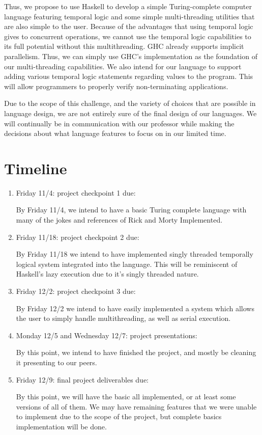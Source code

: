 \documentclass[numbers]{sigplanconf}
\begin{document}
 Thus, we propose to use Haskell to develop a simple Turing-complete
 computer language featuring temporal logic and some simple
 multi-threading utilities that are also simple to the user.
 Because of the advantages that using temporal logic gives to
 concurrent operations, we cannot use the temporal logic 
 capabilities to its full potential without this multithreading.
 GHC already supports implicit parallelism. Thus, we can 
 simply use GHC's implementation as the foundation
 of our multi-threading capabilities. We also intend for our 
 language to support adding various temporal logic
 statements regarding values to the program.
 This will allow programmers to properly verify non-terminating
 applications. 

 Due to the scope of this challenge, and the variety of choices that
 are possible in language design, we are not entirely sure of the
 final design of our languages. We will continually be in communication
 with our professor while making the decisions about what language
 features to focus on in our limited time.
\section{Timeline}
\begin{enumerate}
\item    Friday 11/4: project checkpoint 1 due:

  By Friday 11/4, we intend to have a basic Turing complete language
  with many of the jokes and references of Rick and Morty Implemented.

\item  Friday 11/18: project checkpoint 2 due:

By Friday 11/18 we intend to have implemented singly threaded
temporally logical system integrated into the language. This will be 
reminiscent of Haskell's lazy execution due to it's singly threaded nature.

\item  Friday 12/2: project checkpoint 3 due:
  
  By Friday 12/2 we intend to have easily implemented a system which
  allows the user to simply handle multithreading, as well as serial execution.

\item  Monday 12/5 and Wednesday 12/7: project presentations:

By this point, we intend to have finished the project, and mostly be
cleaning it presenting to our peers.

\item Friday 12/9: final project deliverables due:

By this point, we will have the basic all implemented, or at least
some versions of all of them. We may have remaining features that we
were unable to implement due to the scope of the project, but complete
basics implementation will be done.
\end{enumerate}

\nocite{*}




{}
\end{document}
